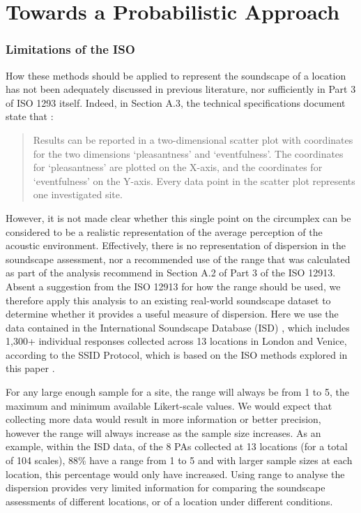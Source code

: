 \chapter{Towards a Probabilistic Approach}
\label{ch:ProbabilisticPOC}

\subsection{Limitations of the ISO}
How these methods should be applied to represent the soundscape of a location has not been adequately discussed in previous literature, nor sufficiently in Part 3 of ISO 1293 itself. Indeed, in Section A.3, the technical specifications document state that \citep[p. 5]{ISO12913Part3}:

\begin{quote}
  Results can be reported in a two-dimensional scatter plot with coordinates for the two dimensions ‘pleasantness’ and ‘eventfulness’. The coordinates for ‘pleasantness’ are plotted on the X-axis, and the coordinates for ‘eventfulness’ on the Y-axis. Every data point in the scatter plot represents one investigated site.
\end{quote}

However, it is not made clear whether this single point on the circumplex can be considered to be a realistic representation of the average perception of the acoustic environment. Effectively, there is no representation of dispersion in the soundscape assessment, nor a recommended use of the range that was calculated as part of the analysis recommend in Section A.2 of Part 3 of the ISO 12913. Absent a suggestion from the ISO 12913 for how the range should be used, we therefore apply this analysis to an existing real-world soundscape dataset to determine whether it provides a useful measure of dispersion. Here we use the data contained in the International Soundscape Database (ISD) \citep{Mitchell2021International}, which includes 1,300+ individual responses collected across 13 locations in London and Venice, according to the SSID Protocol, which is based on the ISO methods explored in this paper \citep{Mitchell2020Soundscape}.

For any large enough sample for a site, the range will always be from 1 to 5, the maximum and minimum available Likert-scale values. We would expect that collecting more data would result in more information or better precision, however the range will always increase as the sample size increases. As an example, within the ISD data, of the 8 PAs collected at 13 locations (for a total of 104 scales), 88\% have a range from 1 to 5 and with larger sample sizes at each location, this percentage would only have increased. Using range to analyse the dispersion provides very limited information for comparing the soundscape assessments of different locations, or of a location under different conditions.

